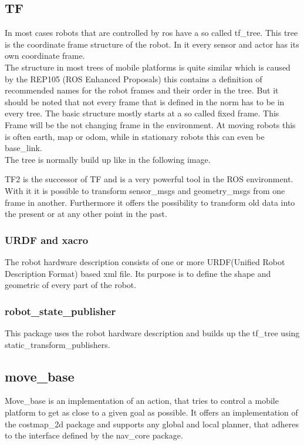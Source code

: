 \subsection{TF}
In most cases robots that are controlled by ros have a so called tf\_tree. This tree is the coordinate frame structure of the robot. In it every sensor and actor has its own coordinate frame.\\
 The structure in most trees of mobile platforms is quite similar which is caused by the REP105 (ROS Enhanced Proposals) this contains a definition of recommended names for the robot frames and their order in the tree. But it should be noted that not every frame that is defined in the norm has to be in every tree. The basic structure mostly starts at a so called fixed frame. This Frame will be the not changing frame in the environment. At moving robots this is often earth, map or odom, while in stationary robots this can even be base\_link.\\
 

The tree is normally build up like in the following image. 

TF2 is the successor of TF and is a very powerful tool in the ROS environment. With it it is possible to transform sensor\_msgs and geometry\_msgs from one frame in another. Furthermore it offers the possibility to transform old data into the present or at any other point in the past.

\subsubsection{URDF and xacro}
The robot hardware description consists of one or more URDF(Unified Robot Description Format) based xml file. Its purpose is to define the shape and geometric of every part of the robot. 

\subsubsection{robot\_state\_publisher}
	This package uses the robot hardware description and builds up the tf\_tree using static\_transform\_publishers.


\subsection{move\_base}
Move\_base is an implementation of an action, that tries to control a mobile platform to get as close to a given goal as possible. It offers an implementation of the costmap\_2d package and supports any global and local planner, that adheres to the interface defined by the nav\_core package\cite{movebase}.

